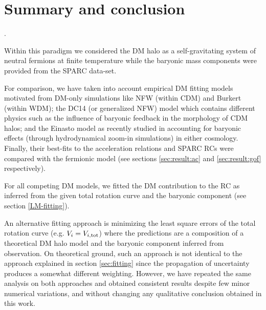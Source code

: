 \section{Summary and conclusion}
\label{sec:conclusion}

.

Within this paradigm we considered the DM halo as a self-gravitating system of neutral fermions at finite temperature while the baryonic mass components were provided from the SPARC data-set. 

For comparison, we have taken into account empirical DM fitting models motivated from DM-only simulations like NFW (within CDM) and Burkert (within WDM); the DC14 (or generalized NFW) model which contains different physics such as the influence of baryonic feedback in the morphology of CDM halos; and the Einasto model as recently studied in \citet{2019MNRAS.483.4086B} accounting for baryonic effects (through hydrodynamical zoom-in simulations) in either cosmology. Finally, their best-fits to the acceleration relations and SPARC RCs were compared with the fermionic model (see sections \ref{sec:result:ac} and \ref{sec:result:gof} respectively).

For all competing DM models, we fitted the DM contribution to the RC as inferred from the given total rotation curve and the baryonic component (see section \ref{LM-fitting}).

An alternative fitting approach is minimizing the least square errors of the total rotation curve (e.g. $V_i = V_{i, \rm tot}$) where the predictions are a composition of a theoretical DM halo model and the baryonic component inferred from observation. On theoretical ground, such an approach is not identical to the approach explained in section \ref{sec:fitting} since the propagation of uncertainty produces a somewhat different weighting. However, we have repeated the same analysis on both approaches and obtained consistent results despite few minor numerical variations, and without changing any qualitative conclusion obtained in this work.


